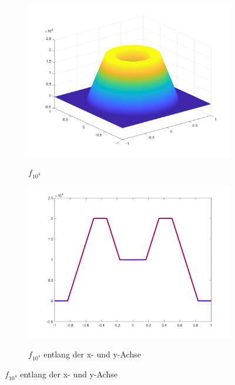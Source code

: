\begin{figure}[p]
  \begin{subfigure}[b]{.48\linewidth}
    \centering
    \caption{$f_{10^4}$}
    \includegraphics[trim = 40 30 30 30, clip, width=\linewidth]
      {pictures/chapExperiments/secGeneralInfo/f01Plots/inSi1e4.png}
    \label{fig:f01AlphaLargeInSi}
  \end{subfigure}
  \quad
  \begin{subfigure}[b]{.48\linewidth}
    \centering
    \caption{$f_{10^4}$ entlang der x- und y-Achse}
    \includegraphics[trim = 50 30 50 20, clip, width=\linewidth]
      {pictures/chapExperiments/secGeneralInfo/f01Plots/inSi1e4Axis.png}
    \label{fig:f01AlphaLargeInSiAxis}
  \end{subfigure}


\end{figure}
